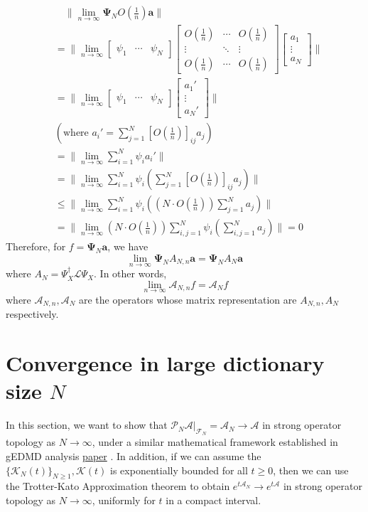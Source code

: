 \documentclass{article}[11]
\begin{document}
\begin{align*}
	&\quad \|\lim_{n\to\infty} \mathbf{\Psi}_N O(\tfrac{1}{n})\mathbf{a}\| \\
	&= \|\lim_{n\to\infty} 
	\begin{bmatrix}
		\psi_1 & \cdots & \psi_N
	\end{bmatrix}
	\begin{bmatrix}
		O(\tfrac{1}{n}) & \cdots & O(\tfrac{1}{n}) \\
		\vdots & \ddots & \vdots \\
		O(\tfrac{1}{n}) & \cdots & O(\tfrac{1}{n})
	\end{bmatrix}
	\begin{bmatrix}
		a_1 \\
		\vdots \\
		a_N
	\end{bmatrix} \| \\
	&= \|\lim_{n\to\infty} 
	\begin{bmatrix}
		\psi_1 & \cdots & \psi_N
	\end{bmatrix}
	\begin{bmatrix}
		a_1' \\
		\vdots \\
		a_N'
	\end{bmatrix} \| \\
	&(\text{where $a_i'=\sum_{j=1}^N [O(\tfrac{1}{n})]_{ij}a_j$}) \\
	&= \|\lim_{n\to\infty} \sum_{i=1}^N \psi_i a_i' \| \\
	&= \|\lim_{n\to\infty} \sum_{i=1}^N \psi_i \left( \sum_{j=1}^N [O(\tfrac{1}{n})]_{ij}a_j \right) \| \\
	&\leq \|\lim_{n\to\infty} \sum_{i=1}^N \psi_i \left( \left(N \cdot O(\tfrac{1}{n})\right) \sum_{j=1}^N a_j \right) \| \\
	&= \|\lim_{n\to\infty} \left(N \cdot O(\tfrac{1}{n})\right) \sum_{i,j=1}^N \psi_i \left( \sum_{i,j=1}^N a_j \right) \| = 0
\end{align*}
Therefore, for $f=\mathbf{\Psi}_N\mathbf{a}$, we have
$$\lim_{n\to\infty} \mathbf{\Psi}_N A_{N,n} \mathbf{a} = \mathbf{\Psi}_N A_N \mathbf{a}$$ 
where $A_N = \Psi_X^{\dagger}\mathcal{L}\Psi_X$. In other words,
$$
\lim_{n\to\infty} \mathcal{A}_{N,n} f = \mathcal{A}_N f
$$
where $\mathcal{A}_{N,n}, \mathcal{A}_N$ are the operators whose matrix representation are $A_{N,n}, A_N$ respectively.




\newpage
\section{Convergence in large dictionary size $N$}
In this section, we want to show that $\mathcal{P}_N\mathcal{A}|_{\mathcal{F}_N} = \mathcal{A}_N \to \mathcal{A}$ in strong operator topology as $N \to \infty$, under a similar mathematical framework established in gEDMD analysis \href{https://arxiv.org/abs/2405.00539}{paper} . In addition, if we can assume the $\{\mathcal{K}_{N}(t)\}_{N\geq 1}, \mathcal{K}(t)$ is exponentially bounded for all $t\geq 0$, then we can use the Trotter-Kato Approximation theorem to obtain $e^{t\mathcal{A}_N} \to e^{t\mathcal{A}}$ in strong operator topology as $N \to \infty$, uniformly for $t$ in a compact interval.
\end{document}
